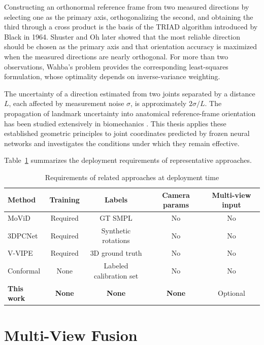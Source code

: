 \documentclass[12pt,a4paper]{report}
\begin{document}
Constructing an orthonormal reference frame from two measured directions by selecting one as the primary axis, orthogonalizing the second, and obtaining the third through a cross product is the basis of the TRIAD algorithm introduced by Black \cite{triad} in 1964. Shuster and Oh \cite{shuster} later showed that the most reliable direction should be chosen as the primary axis and that orientation accuracy is maximized when the measured directions are nearly orthogonal. For more than two observations, Wahba's problem \cite{wahba} provides the corresponding least-squares formulation, whose optimality depends on inverse-variance weighting.

The uncertainty of a direction estimated from two joints separated by a distance $L$, each affected by measurement noise $\sigma$, is approximately $2\sigma/L$. The propagation of landmark uncertainty into anatomical reference-frame orientation has been studied extensively in biomechanics \cite{dellacroce1999,dellacroce2005}. This thesis applies these established geometric principles to joint coordinates predicted by frozen neural networks and investigates the conditions under which they remain effective.

Table~\ref{tab:requirements} summarizes the deployment requirements of representative approaches.

\begin{table}[H]
\centering
\caption{Requirements of related approaches at deployment time}
\label{tab:requirements}
\small
\begin{tabular}{|l|c|c|c|c|}
\hline
\textbf{Method} & \textbf{Training} & \textbf{Labels} & \textbf{Camera params} & \textbf{Multi-view input} \\
\hline
MoViD \cite{3dpcnet2} & Required & GT SMPL & No & No \\
\hline
3DPCNet \cite{3dpcnet} & Required & Synthetic rotations & No & No \\
\hline
V-VIPE \cite{vvipe} & Required & 3D ground truth & No & No \\
\hline
Conformal \cite{yangpavone} & None & Labeled calibration set & No & No \\
\hline
\textbf{This work} & \textbf{None} & \textbf{None} & \textbf{None} & Optional \\
\hline
\end{tabular}
\end{table}

\section{Multi-View Fusion}
\end{document}
